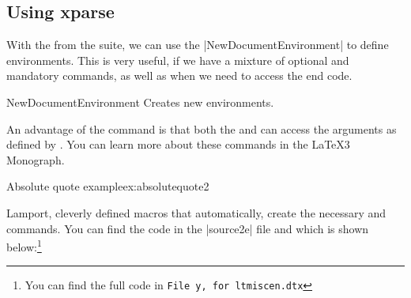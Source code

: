 \subsection{Using xparse}

With the  from the  suite, we can use the |NewDocumentEnvironment| to define environments. This is very useful, if we have a mixture of optional and mandatory commands, as well as when we need to access the end code.

\begin{docCommand}{NewDocumentEnvironment}{}
Creates new environments.
\end{docCommand}

An advantage of the command is that both the 
and  can access the arguments as defined by . You can learn more about these commands in the LaTeX3 Monograph. 


\begin{texexample}{Absolute quote example}{ex:absolutequote2}
\makeatletter
{}
               {%
                  \item\relax\footnotesize
                }%
               {\endlist}               
\makeatother  
\lipsum[1]
\begin{absolutequotation}
\lipsum[3]
\end{absolutequotation}
\lipsum[1]

\end{texexample}

Lamport, cleverly defined macros that automatically, create the necessary \tex {} and  commands. You can find the code in the |source2e| file and which is shown below:\footnote{You can find the full code in \texttt{File y, for ltmiscen.dtx}}

\begin{teXXX}
\def\begin#1{%
  \@ifundefined{#1}%
  {\def\reserved@a{\@latex@error{Environment #1 undefined}\@eha}}%
  {\def\reserved@a{\def\@currenvir{#1}%
  \edef\@currenvline{\on@line}%
  \csname #1\endcsname}}%
  \@ignorefalse
  \begingroup\@endpefalse\reserved@a}


\def\end#1{%
  \csname end#1\endcsname\@checkend{#1}%
  \expandafter\endgroup\if@endpe\@doendpe\fi
  \if@ignore\@ignorefalse\ignorespaces\fi}
\end{teXXX}

